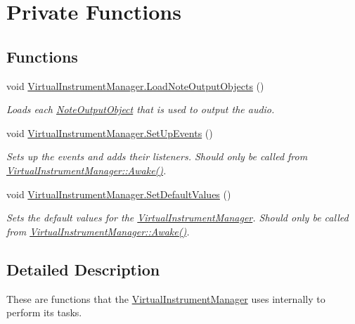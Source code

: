 \hypertarget{group___v_i_m_priv_func}{}\section{Private Functions}
\label{group___v_i_m_priv_func}
\subsection*{Functions}
\begin{DoxyCompactItemize}
\item 
void \hyperlink{group___v_i_m_priv_func_ga8817e32cc5074737b4d9489922b0fcb8}{Virtual\+Instrument\+Manager.\+Load\+Note\+Output\+Objects} ()
\begin{DoxyCompactList}\small\item\em Loads each \hyperlink{class_note_output_object}{Note\+Output\+Object} that is used to output the audio. \end{DoxyCompactList}\item 
void \hyperlink{group___v_i_m_priv_func_gaa207d18111d38374017c580de4077589}{Virtual\+Instrument\+Manager.\+Set\+Up\+Events} ()
\begin{DoxyCompactList}\small\item\em Sets up the events and adds their listeners. Should only be called from \hyperlink{group___v_i_m_unity_gab92bac4e22476ffe39fc40f49fbd6ae5}{Virtual\+Instrument\+Manager\+::\+Awake()}. \end{DoxyCompactList}\item 
void \hyperlink{group___v_i_m_priv_func_gaa9e05e51f025afb0ab5cb2a8532c8bba}{Virtual\+Instrument\+Manager.\+Set\+Default\+Values} ()
\begin{DoxyCompactList}\small\item\em Sets the default values for the \hyperlink{class_virtual_instrument_manager}{Virtual\+Instrument\+Manager}. Should only be called from \hyperlink{group___v_i_m_unity_gab92bac4e22476ffe39fc40f49fbd6ae5}{Virtual\+Instrument\+Manager\+::\+Awake()}. \end{DoxyCompactList}\end{DoxyCompactItemize}


\subsection{Detailed Description}
These are functions that the \hyperlink{class_virtual_instrument_manager}{Virtual\+Instrument\+Manager} uses internally to perform its tasks. 

